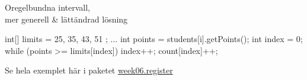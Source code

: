 \documentclass{lecturenotes}
\begin{document}
\begin{Slide}{Oregelbundna intervall, \\mer generell \& lättändrad lösning}
\begin{Code}
int[] limits = { 25, 35, 43, 51 };
...
int points = students[i].getPoints();
int index = 0;
while (points >= limits[index]) {
    index++;
}
count[index]++;
\end{Code}
Se hela exemplet här i paketet \href{https://github.com/bjornregnell/lth-eda016-2015/tree/master/lectures/examples/eclipse-ws/lecture-examples/src/week06/register}{week06.register}
\end{Slide} 
\end{document}
